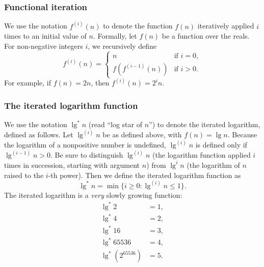 \documentclass{report}
\begin{document}
        \bigbreak \noindent 
        \subsubsection{Functional iteration}
        \bigbreak \noindent 
        We use the notation \( f^{(i)}(n) \) to denote the function \( f(n) \) iteratively applied \( i \) times to an initial value of \( n \). Formally, let \( f(n) \) be a function over the reals. For non-negative integers \( i \), we recursively define
        \[
            f^{(i)}(n) = 
            \begin{cases} 
                n & \text{if } i = 0 , \\
                f(f^{(i-1)}(n)) & \text{if } i > 0 .
            \end{cases}
        \]
        For example, if \( f(n) = 2n \), then \( f^{(i)}(n) = 2^i n \).

        \bigbreak \noindent 
        \subsubsection{The iterated logarithm function}
        \bigbreak \noindent 
        We use the notation \( \lg^* n \) (read “log star of \( n \)”) to denote the iterated logarithm, defined as follows. Let \( \lg^{(i)} n \) be as defined above, with \( f(n) = \lg n \). Because the logarithm of a nonpositive number is undefined, \( \lg^{(i)} n \) is defined only if \( \lg^{(i-1)} n > 0 \). Be sure to distinguish \( \lg^{(i)} n \) (the logarithm function applied \( i \) times in succession, starting with argument \( n \)) from \( \lg^i n \) (the logarithm of \( n \) raised to the \( i \)-th power). Then we define the iterated logarithm function as
        \[
            \lg^* n = \min \{ i \geq 0 : \lg^{(i)} n \leq 1 \} .
        \]
        The iterated logarithm is a \textit{very} slowly growing function:
        \[
            \begin{aligned}
                \lg^* 2 &= 1 , \\
                \lg^* 4 &= 2 , \\
                \lg^* 16 &= 3 , \\
                \lg^* 65536 &= 4 , \\
                \lg^* (2^{65536}) &= 5 .
            \end{aligned}
        \]
\end{document}
